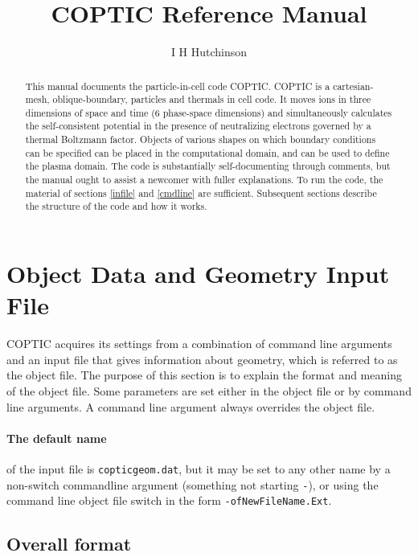 \documentclass[12pt]{article}
\title{COPTIC Reference Manual}
\author{I H Hutchinson}
\begin{document}
\maketitle
\begin{abstract}
  
  This manual documents the particle-in-cell code COPTIC. COPTIC is a
  cartesian-mesh, oblique-boundary, particles and thermals in cell
  code.  It moves ions in three dimensions of space and time (6
  phase-space dimensions) and simultaneously calculates the
  self-consistent potential in the presence of neutralizing electrons
  governed by a thermal Boltzmann factor. Objects of various shapes on
  which boundary conditions can be specified can be placed in the
  computational domain, and can be used to define the plasma
  domain. The code is substantially self-documenting through comments,
  but the manual ought to assist a newcomer with fuller
  explanations. To run the code, the material of sections \ref{infile}
  and \ref{cmdline} are sufficient. Subsequent sections describe the
  structure of the code and how it works.
\end{abstract}


\tableofcontents


\section{Object Data and Geometry Input File}\label{infile}

COPTIC acquires its settings from a combination of command line
arguments and an input file that gives information about geometry,
which is referred to as the object file.  The purpose of this section
is to explain the format and meaning of the object file. Some
parameters are set either in the object file or by command line
arguments. A command line argument always overrides the object file.


\paragraph{The default name} of the input file is \verb!copticgeom.dat!, but it
may be set to any other name by a non-switch commandline argument
(something not starting \verb!-!), or using the command line object file
switch in the form \verb!-ofNewFileName.Ext!.

\subsection{Overall format}
\end{document}
